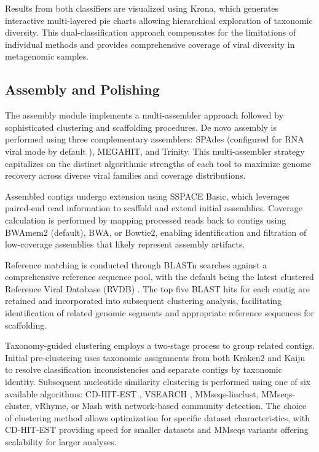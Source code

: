 \documentclass[unnumsec,webpdf,contemporary,large]{oup-authoring-template}%
\theoremstyle{thmstyleone}%
\theoremstyle{thmstyletwo}%
\theoremstyle{thmstylethree}%
\begin{document}
Results from both classifiers are visualized using Krona, which generates interactive multi-layered pie charts allowing hierarchical exploration of taxonomic diversity. This dual-classification approach compensates for the limitations of individual methods and provides comprehensive coverage of viral diversity in metagenomic samples.

\subsection{Assembly and Polishing}\label{subsec_assembly}

The assembly module implements a multi-assembler approach followed by sophisticated clustering and scaffolding procedures. De novo assembly is performed using three complementary assemblers: SPAdes \cite{Bankevich2012-lh} (configured for RNA viral mode by default \cite{Meleshko2021-gb}), MEGAHIT, and Trinity. This multi-assembler strategy capitalizes on the distinct algorithmic strengths of each tool to maximize genome recovery across diverse viral families and coverage distributions.

Assembled contigs undergo extension using SSPACE Basic, which leverages paired-end read information to scaffold and extend initial assemblies. Coverage calculation is performed by mapping processed reads back to contigs using BWAmem2 (default), BWA, or Bowtie2, enabling identification and filtration of low-coverage assemblies that likely represent assembly artifacts.

Reference matching is conducted through BLASTn searches against a comprehensive reference sequence pool, with the default being the latest clustered Reference Viral Database (RVDB) \cite{Goodacre2018-dw}. The top five BLAST hits for each contig are retained and incorporated into subsequent clustering analysis, facilitating identification of related genomic segments and appropriate reference sequences for scaffolding.

Taxonomy-guided clustering employs a two-stage process to group related contigs. Initial pre-clustering uses taxonomic assignments from both Kraken2 and Kaiju to resolve classification inconsistencies and separate contigs by taxonomic identity. Subsequent nucleotide similarity clustering is performed using one of six available algorithms: CD-HIT-EST \cite{Li2006-nj}, VSEARCH \cite{Rognes2016-ju}, MMseqs-linclust, MMseqs-cluster, vRhyme, or Mash with network-based community detection. The choice of clustering method allows optimization for specific dataset characteristics, with CD-HIT-EST providing speed for smaller datasets and MMseqs variants offering scalability for larger analyses.
\end{document}
